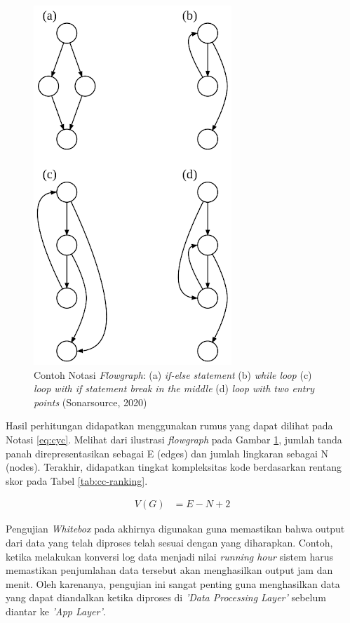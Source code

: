 \begin{figure}[!h]
    \includegraphics[width=.4\linewidth, center]{images/tinjauan-pustaka/fig-flowgraph.png}
    \caption{Contoh Notasi \textit{Flowgraph}: (a) \textit{if-else statement} (b) \textit{while loop} (c) \textit{loop with if statement break in the middle} (d) \textit{loop with two entry points} (Sonarsource, 2020)}
    \label{fig:flowgraph-example}
\end{figure}


 Hasil perhitungan didapatkan menggunakan rumus yang dapat dilihat pada Notasi \ref{eq:cyc}. Melihat dari ilustrasi \textit{flowgraph} pada Gambar \ref{fig:flowgraph-example}, jumlah tanda panah direpresentasikan sebagai E (edges) dan jumlah lingkaran sebagai N (nodes). Terakhir, didapatkan tingkat kompleksitas kode berdasarkan rentang skor pada Tabel \ref{tab:cc-ranking}.

 \begin{equation}\label{eq:cyc}
    \begin{split}
        V(G) & = E - N + 2
    \end{split}
\end{equation}



Pengujian \textit{Whitebox} pada akhirnya digunakan guna memastikan bahwa output dari data yang telah diproses telah sesuai dengan yang diharapkan. Contoh, ketika melakukan konversi log data menjadi nilai \textit{running hour} sistem harus memastikan penjumlahan data tersebut akan menghasilkan output jam dan menit. Oleh karenanya, pengujian ini sangat penting guna menghasilkan data yang dapat diandalkan ketika diproses di \textit{'Data Processing Layer'} sebelum diantar ke \textit{'App Layer'}.


